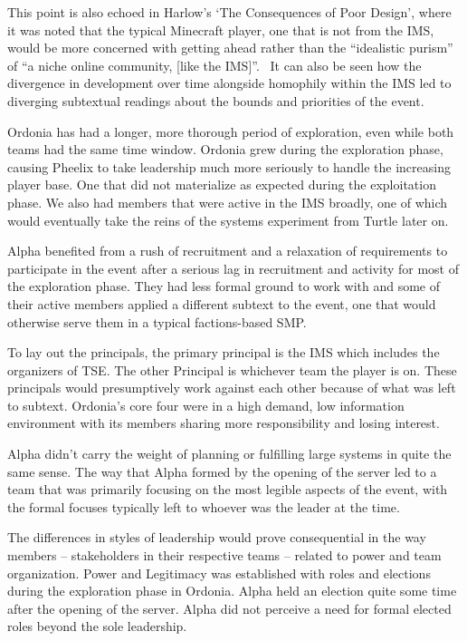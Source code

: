 This point is also echoed in Harlow's `The Consequences of Poor Design', where it was noted that the typical Minecraft player, one that is not from the IMS, would be more concerned with getting ahead rather than the “idealistic purism” of “a niche online community, [like the IMS]”.~\citep{Harlow(2026)} It can also be seen how the divergence in development over time alongside homophily within the IMS led to diverging subtextual readings about the bounds and priorities of the event.

Ordonia has had a longer, more thorough period of exploration, even while both teams had the same time window. Ordonia grew during the exploration phase, causing Pheelix to take leadership much more seriously to handle the increasing player base. One that did not materialize as expected during the exploitation phase. We also had members that were active in the IMS broadly, one of which would eventually take the reins of the systems experiment from Turtle later on.

Alpha benefited from a rush of recruitment and a relaxation of requirements to participate in the event after a serious lag in recruitment and activity for most of the exploration phase. They had less formal ground to work with and some of their active members applied a different subtext to the event, one that would otherwise serve them in a typical factions-based SMP.

To lay out the principals, the primary principal is the IMS which includes the organizers of TSE. The other Principal is whichever team the player is on. These principals would presumptively work against each other because of what was left to subtext. Ordonia's core four were in a high demand, low information environment with its members sharing more responsibility and losing interest.

Alpha didn't carry the weight of planning or fulfilling large systems in quite the same sense. The way that Alpha formed by the opening of the server led to a team that was primarily focusing on the most legible aspects of the event, with the formal focuses typically left to whoever was the leader at the time.

The differences in styles of leadership would prove consequential in the way members – stakeholders in their respective teams – related to power and team organization. Power and Legitimacy was established with roles and elections during the exploration phase in Ordonia. Alpha held an election quite some time after the opening of the server. Alpha did not perceive a need for formal elected roles beyond the sole leadership.

